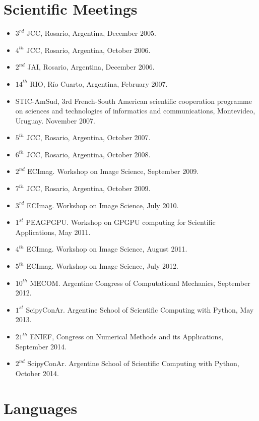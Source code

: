 \documentclass[a4paper,12pt]{article}
\begin{document}
\section*{Scientific Meetings}
\begin{small}
\begin{itemize}
\item $3^{rd}$ JCC, Rosario, Argentina, December 2005.
\item $4^{th}$ JCC, Rosario, Argentina, October 2006.
\item $2^{nd}$ JAI, Rosario, Argentina, December 2006.
\item $14^{th}$ RIO, R\'io Cuarto, Argentina, February 2007.
\item STIC-AmSud, 3rd French-South American scientific cooperation programme on sciences and technologies of informatics and communications, Montevideo, Uruguay. November 2007.
\item $5^{th}$ JCC, Rosario, Argentina, October 2007.
\item $6^{th}$ JCC, Rosario, Argentina, October 2008.
\item $2^{nd}$ ECImag. Workshop on Image Science, September 2009.
\item $7^{th}$ JCC, Rosario, Argentina, October 2009.
\item $3^{rd}$ ECImag. Workshop on Image Science, July 2010.
\item $1^{st}$ PEAGPGPU. Workshop on GPGPU computing for Scientific Applications, May 2011.
\item $4^{th}$ ECImag. Workshop on Image Science, August 2011.
\item $5^{th}$ ECImag. Workshop on Image Science, July 2012.
\item $10^{th}$ MECOM. Argentine Congress of Computational Mechanics, September 2012.
\item $1^{st}$ ScipyConAr. Argentine School of Scientific Computing with Python, May 2013.
\item $21^{th}$ ENIEF,  Congress on Numerical Methods and its Applications, September 2014.
\item $2^{nd}$ ScipyConAr. Argentine School of Scientific Computing with Python, October 2014.
\end{itemize}
\end{small}


\section*{Languages}
\end{document}
